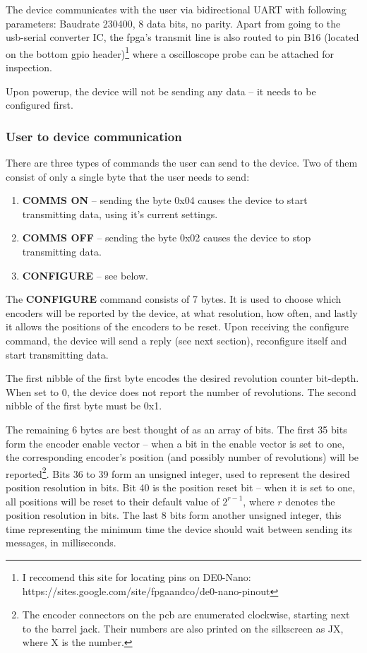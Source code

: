 \documentclass[twoside]{article}
\begin{document}
\par The device communicates with the user via bidirectional UART with following parameters: Baudrate 230400, 8 data bits, no parity. Apart from going to the usb-serial converter IC, the fpga's transmit line is also routed to pin B16 (located on the bottom gpio header)\footnote{I reccomend this site for locating pins on DE0-Nano: https://sites.google.com/site/fpgaandco/de0-nano-pinout} where a oscilloscope probe can be attached for inspection.

Upon powerup, the device will not be sending any data -- it needs to be configured first.

\subsubsection{User to device communication}

There are three types of commands the user can send to the device. Two of them consist of only a single byte that the user needs to send:

\begin{enumerate}
\item \textbf{COMMS ON} -- sending the byte 0x04 causes the device to start transmitting data, using it's current settings.
\item \textbf{COMMS OFF} -- sending the byte 0x02 causes the device to stop transmitting data.
\item \textbf{CONFIGURE} -- see below.
\end{enumerate}

The \textbf{CONFIGURE} command consists of 7 bytes. It is used to choose which encoders will be reported by the device, at what resolution, how often, and lastly it allows the positions of the encoders to be reset. Upon receiving the configure command, the device will send a reply (see next section), reconfigure itself and start transmitting data.

The first nibble of the first byte encodes the desired revolution counter bit-depth. When set to 0, the device does not report the number of revolutions. The second nibble of the first byte must be 0x1. 

The remaining 6 bytes are best thought of as an array of bits. The first 35 bits form the encoder enable vector -- when a bit in the enable vector is set to one, the corresponding encoder's position (and possibly number of revolutions) will be reported\footnote{The encoder connectors on the pcb are enumerated clockwise, starting next to the barrel jack. Their numbers are also printed on the silkscreen as JX, where X is the number.}. Bits 36 to 39 form an unsigned integer, used to represent the desired position resolution in bits. Bit 40 is the position  reset bit -- when it is set to one, all positions will be reset to their default value of $2^{r-1}$, where $r$ denotes the position resolution in bits. The last 8 bits form another unsigned integer, this time representing the minimum time the device should wait between sending its messages, in milliseconds.
\end{document}
